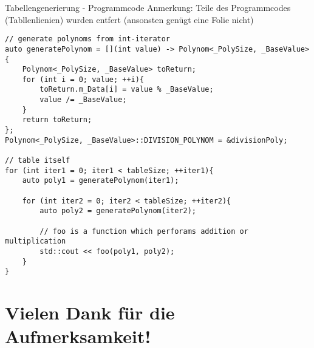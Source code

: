 \documentclass{beamer}
\begin{document}
    \begin{frame}[fragile]{Tabellengenerierung - \newline Programmcode}
	    Anmerkung: Teile des Programmcodes (Tabllenlienien) \newline wurden entfert (ansonsten genügt eine Folie nicht)
    	\begin{lstlisting}[style=numbers]
// generate polynoms from int-iterator
auto generatePolynom = [](int value) -> Polynom<_PolySize, _BaseValue>{
    Polynom<_PolySize, _BaseValue> toReturn;
    for (int i = 0; value; ++i){
        toReturn.m_Data[i] = value % _BaseValue;
        value /= _BaseValue;
    }
    return toReturn;
};
Polynom<_PolySize, _BaseValue>::DIVISION_POLYNOM = &divisionPoly;

// table itself
for (int iter1 = 0; iter1 < tableSize; ++iter1){
    auto poly1 = generatePolynom(iter1);

    for (int iter2 = 0; iter2 < tableSize; ++iter2){
        auto poly2 = generatePolynom(iter2);

        // foo is a function which perforams addition or multiplication
        std::cout << foo(poly1, poly2);
    }
}
\end{lstlisting}
\end{frame}


\section*{Vielen Dank für die Aufmerksamkeit!}
  
\end{document}
